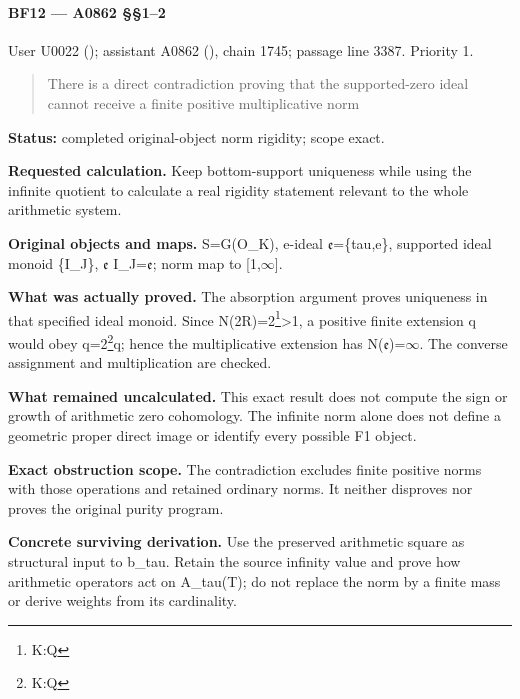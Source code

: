 \paragraph{BF12 --- A0862 §§1--2}\label{bf12-a0862-12}

User U0022 (\protect{});
assistant A0862 (\protect{}),
chain 1745; passage line 3387. Priority 1.

\begin{quote}
There is a direct contradiction proving that the supported-zero ideal
cannot receive a finite positive multiplicative norm
\end{quote}

\textbf{Status:} completed original-object norm rigidity; scope exact.

\textbf{Requested calculation.} Keep bottom-support uniqueness while
using the infinite quotient to calculate a real rigidity statement
relevant to the whole arithmetic system.

\textbf{Original objects and maps.} S=G(O\_K), e-ideal
\allowbreak{}\ensuremath{𝔢}\allowbreak{}=\{tau,e\}, supported ideal
monoid \{I\_J\}, \allowbreak{}\ensuremath{𝔢}\allowbreak{}
I\_J=\allowbreak{}\ensuremath{𝔢}\allowbreak{}; norm map to
[1,\allowbreak{}\ensuremath{∞}\allowbreak{}].

\textbf{What was actually proved.} The absorption argument proves
uniqueness in that specified ideal monoid. Since
N(2R)=2\footnote{K:Q}\textgreater1, a positive finite extension q would
obey q=2\footnote{K:Q}q; hence the multiplicative extension has
N(\allowbreak{}\ensuremath{𝔢}\allowbreak{})=\allowbreak{}\ensuremath{∞}\allowbreak{}.
The converse assignment and multiplication are checked.

\textbf{What remained uncalculated.} This exact result does not compute
the sign or growth of arithmetic zero cohomology. The infinite norm
alone does not define a geometric proper direct image or identify every
possible F1 object.

\textbf{Exact obstruction scope.} The contradiction excludes finite
positive norms with those operations and retained ordinary norms. It
neither disproves nor proves the original purity program.

\textbf{Concrete surviving derivation.} Use the preserved arithmetic
square as structural input to b\_tau. Retain the source infinity value
and prove how arithmetic operators act on A\_tau(T); do not replace the
norm by a finite mass or derive weights from its cardinality.

